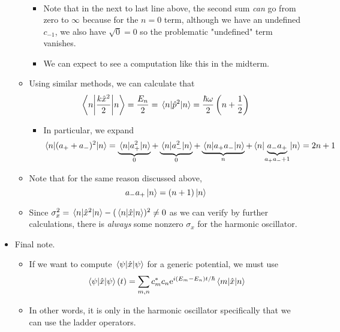 \documentclass[../notes.tex]{subfiles}
\begin{document}
\begin{itemize}
\begin{itemize}
\begin{align*}
        \end{align*}
        \endgroup
        \begin{itemize}
            \item Note that in the next to last line above, the second sum \emph{can} go from zero to $\infty$ because for the $n=0$ term, although we have an undefined $c_{-1}$, we also have $\sqrt{0}=0$ so the problematic "undefined" term vanishes.
            \item We can expect to see a computation like this in the midterm.
        \end{itemize}
        \item Using similar methods, we can calculate that
        \begin{equation*}
            \ev**{\frac{k\hat{x}^2}{2}}{n} = \frac{E_n}{2}
            = \ev{\hat{p}^2}{n}
            = \frac{\hbar\omega}{2}\left( n+\frac{1}{2} \right)
        \end{equation*}
        \begin{itemize}
            \item In particular, we expand
            \begin{equation*}
                \ev{(a_++a_-)^2}{n} = \underbrace{\ev{a_+^2}{n}}_0+\underbrace{\ev{a_-^2}{n}}_0+\underbrace{\ev{a_+a_-}{n}}_n+\ev{\underbrace{a_-a_+}_{a_+a_-+1}}{n}
                = 2n+1
            \end{equation*}
        \end{itemize}
        \item Note that for the same reason discussed above,
        \begin{equation*}
            a_-a_+\ket{n} = (n+1)\ket{n}
        \end{equation*}
        \item Since $\sigma_x^2=\ev{\hat{x}^2}{n}-(\ev{\hat{x}}{n})^2\neq 0$ as we can verify by further calculations, there is \emph{always} some nonzero $\sigma_x$ for the harmonic oscillator.
    \end{itemize}
    \item Final note.
    \begin{itemize}
        \item If we want to compute $\ev{\hat{x}}{\psi}$ for a generic potential, we must use
        \begin{equation*}
            \ev{\hat{x}}{\psi}(t) = \sum_{m,n}c_m^*c_n\e[i(E_m-E_n)t/\hbar]\mel{m}{\hat{x}}{n}
        \end{equation*}
        \item In other words, it is only in the harmonic oscillator specifically that we can use the ladder operators.

\end{itemize}
\end{itemize}
\end{document}
